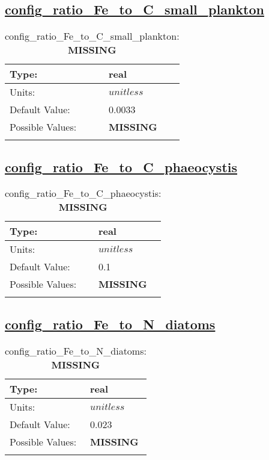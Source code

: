 \subsection[config\_ratio\_Fe\_to\_C\_small\_plankton]{\hyperref[sec:nm_tab_biogeochemistry]{config\_ratio\_Fe\_to\_C\_small\_plankton}}
\label{subsec:nm_sec_config_ratio_Fe_to_C_small_plankton}
\begin{center}
\begin{longtable}{| p{2.0in} || p{4.0in} |}
    \hline
    Type: & real \\
    \hline
    Units: & $unitless$ \\
    \hline
    Default Value: & 0.0033 \\
    \hline
    Possible Values: & {\bf \color{red} MISSING} \\
    \hline
    \caption{config\_ratio\_Fe\_to\_C\_small\_plankton: {\bf \color{red} MISSING}}
\end{longtable}
\end{center}
\subsection[config\_ratio\_Fe\_to\_C\_phaeocystis]{\hyperref[sec:nm_tab_biogeochemistry]{config\_ratio\_Fe\_to\_C\_phaeocystis}}
\label{subsec:nm_sec_config_ratio_Fe_to_C_phaeocystis}
\begin{center}
\begin{longtable}{| p{2.0in} || p{4.0in} |}
    \hline
    Type: & real \\
    \hline
    Units: & $unitless$ \\
    \hline
    Default Value: & 0.1 \\
    \hline
    Possible Values: & {\bf \color{red} MISSING} \\
    \hline
    \caption{config\_ratio\_Fe\_to\_C\_phaeocystis: {\bf \color{red} MISSING}}
\end{longtable}
\end{center}
\subsection[config\_ratio\_Fe\_to\_N\_diatoms]{\hyperref[sec:nm_tab_biogeochemistry]{config\_ratio\_Fe\_to\_N\_diatoms}}
\label{subsec:nm_sec_config_ratio_Fe_to_N_diatoms}
\begin{center}
\begin{longtable}{| p{2.0in} || p{4.0in} |}
    \hline
    Type: & real \\
    \hline
    Units: & $unitless$ \\
    \hline
    Default Value: & 0.023 \\
    \hline
    Possible Values: & {\bf \color{red} MISSING} \\
    \hline
    \caption{config\_ratio\_Fe\_to\_N\_diatoms: {\bf \color{red} MISSING}}
\end{longtable}
\end{center}
